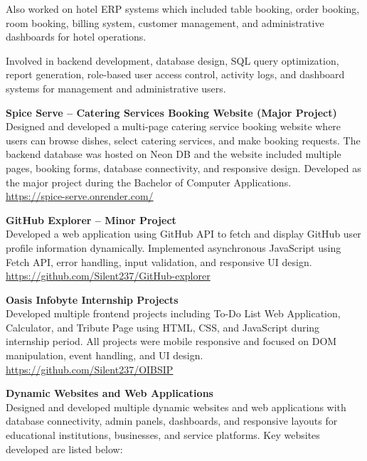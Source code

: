 \documentclass[a4paper,10.9pt]{article}
\begin{document}
Also worked on hotel ERP systems which included table booking, order booking, room booking, billing system, customer management, and administrative dashboards for hotel operations. 

Involved in backend development, database design, SQL query optimization, report generation, role-based user access control, activity logs, and dashboard systems for management and administrative users.

\vspace{5pt}

\textbf{Spice Serve – Catering Services Booking Website (Major Project)} \\
Designed and developed a multi-page catering service booking website where users can browse dishes, select catering services, and make booking requests. The backend database was hosted on Neon DB and the website included multiple pages, booking forms, database connectivity, and responsive design. Developed as the major project during the Bachelor of Computer Applications. \\
\href{https://spice-serve.onrender.com/}{https://spice-serve.onrender.com/}

\vspace{5pt}

\textbf{GitHub Explorer – Minor Project} \\
Developed a web application using GitHub API to fetch and display GitHub user profile information dynamically. Implemented asynchronous JavaScript using Fetch API, error handling, input validation, and responsive UI design. \\
\href{https://github.com/Silent237/GitHub-explorer}{https://github.com/Silent237/GitHub-explorer}

\vspace{5pt}

\textbf{Oasis Infobyte Internship Projects} \\
Developed multiple frontend projects including To-Do List Web Application, Calculator, and Tribute Page using HTML, CSS, and JavaScript during internship period. All projects were mobile responsive and focused on DOM manipulation, event handling, and UI design. \\
\href{https://github.com/Silent237/OIBSIP}{https://github.com/Silent237/OIBSIP}

\vspace{5pt}

\textbf{Dynamic Websites and Web Applications} \\
Designed and developed multiple dynamic websites and web applications with database connectivity, admin panels, dashboards, and responsive layouts for educational institutions, businesses, and service platforms. Key websites developed are listed below:
\end{document}
